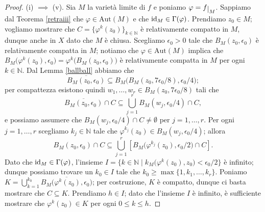 \begin{proof}
    (i) $\implies$ (v). Sia $M$ la varietà limite di $f$ e poniamo $\varphi=f\restrict{M}$. Sappiamo dal Teorema \ref{retraiii} che $\varphi\in\text{Aut}(M)$ e che $\operatorname{id}_M\in\Gamma(\varphi)$. Prendiamo $z_0 \in M$; vogliamo mostrare che $C=\{\varphi^k(z_0)\}_{k\in\mathbb{N}}$ è relativamente compatto in $M$, dunque anche in $X$ dato che $M$ è chiusa. Scegliamo $\epsilon_0>0$ tale che $B_M(z_0,\epsilon_0)$ è relativamente compatta in $M$; notiamo che $\varphi\in\text{Aut}(M)$ implica che $B_M\big(\varphi^k(z_0),\epsilon_0\big)=\varphi^k\big(B_M(z_0,\epsilon_0)\big)$ è relativamente compatta in $M$ per ogni $k \in \mathbb{N}$. Dal Lemma \ref{ballball} abbiamo che
    $$\overline{B_M(z_0,\epsilon_0)} \subseteq B_M\big(B_M(z_0,7\epsilon_0/8),\epsilon_0/4\big);$$
    per compattezza esistono quindi $w_1,\dots,w_r \in B_M(z_0,7\epsilon_0/8)$ tali che
    $$\overline{B_M(z_0,\epsilon_0)}\cap C\subseteq \bigcup_{j=1}^r B_M(w_j,\epsilon_0/4)\cap C,$$
    e possiamo assumere che $B_M(w_j,\epsilon_0/4)\cap C\not=\emptyset$ per $j=1,\dots,r$.
    Per ogni $j=1,\dots, r$ scegliamo $k_j\in\mathbb{N}$ tale che $\varphi^{k_j}(z_0)\in B_M(w_j,\epsilon_0/4)$; allora
    \begin{equation}\label{capci}
        B_M(z_0,\epsilon_0)\cap C \subseteq \bigcup_{j=1}^r \left[B_M\big(\varphi^{k_j}(z_0),\epsilon_0/2\big)\cap C\right].
    \end{equation}
    Dato che $\operatorname{id}_M\in\Gamma(\varphi)$, l'insieme $I=\{k\in\mathbb{N}\mid k_M\big(\varphi^k(z_0),z_0\big)<\epsilon_0/2\}$ è infinito; dunque possiamo trovare un $k_0 \in I$ tale che $k_0 \ge \max\{1,k_1,\dots,k_r\}$. Poniamo $\displaystyle K=\bigcup_{k=1}^{k_0}\overline{B_M\big(\varphi^k(z_0),\epsilon_0\big)}$; per costruzione, $K$ è compatto, dunque ci basta mostrare che $C \subseteq K$. Prendiamo $h \in I$; dato che l'insieme $I$ è infinito, è sufficiente mostrare che $\varphi^k(z_0) \in K$ per ogni $0 \le k \le h$.


\end{proof}
